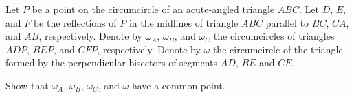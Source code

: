 Let $P$ be a point on the circumcircle of an acute-angled triangle $ABC$. Let $D$, $E$, and $F$ be the reflections of $P$ in the midlines of triangle $ABC$ parallel to $BC$, $CA$, and $AB$, respectively. Denote by $\omega_A$, $\omega_B$, and $\omega_C$ the circumcircles of triangles $ADP$, $BEP$, and $CFP$, respectively. Denote by $\omega$ the circumcircle of the triangle formed by the perpendicular bisectors of segments $AD$, $BE$ and $CF$.

Show that $\omega_A$, $\omega_B$, $\omega_C$, and $\omega$ have a common point.
